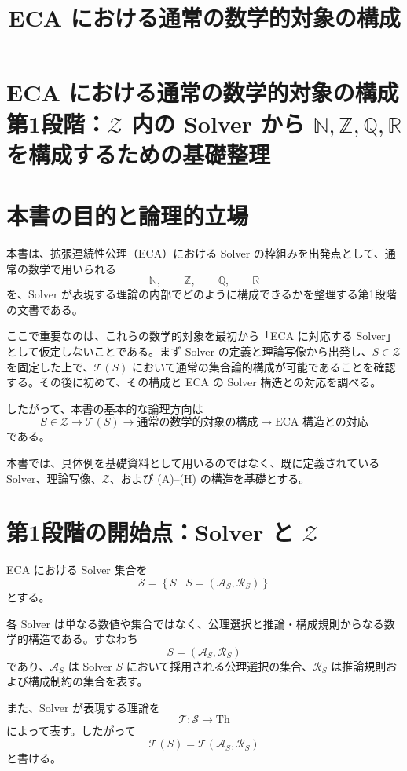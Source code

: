 \documentclass[a4paper,11pt]{article}
\title{ECA における通常の数学的対象の構成}
\author{}
\date{}
\newcommand{\Solver}{\mathcal{S}}
\newcommand{\Aset}{\mathcal{A}}
\newcommand{\Rset}{\mathcal{R}}
\newcommand{\Th}{\mathrm{Th}}
\newcommand{\Th}{\mathrm{Th}}
\begin{document}
\maketitle

\section{ECA における通常の数学的対象の構成 \large{第1段階：$\mathcal{Z}$ 内の Solver から $\mathbb{N},\mathbb{Z},\mathbb{Q},\mathbb{R}$ を構成するための基礎整理}}

\section{本書の目的と論理的立場}
本書は、拡張連続性公理（ECA）における Solver の枠組みを出発点として、通常の数学で用いられる
\[
\mathbb{N},\qquad \mathbb{Z},\qquad \mathbb{Q},\qquad \mathbb{R}
\]
を、Solver が表現する理論の内部でどのように構成できるかを整理する第1段階の文書である。

ここで重要なのは、これらの数学的対象を最初から「ECA に対応する Solver」として仮定しないことである。まず Solver の定義と理論写像から出発し、$S\in\mathcal{Z}$ を固定した上で、$\mathcal{T}(S)$ において通常の集合論的構成が可能であることを確認する。その後に初めて、その構成と ECA の Solver 構造との対応を調べる。

したがって、本書の基本的な論理方向は
\[
\boxed{S\in\mathcal{Z}\longrightarrow\mathcal{T}(S)\longrightarrow\text{通常の数学的対象の構成}\longrightarrow\text{ECA 構造との対応}}
\]
である。

本書では、具体例を基礎資料として用いるのではなく、既に定義されている Solver、理論写像、$\mathcal{Z}$、および (A)--(H) の構造を基礎とする。

\section{第1段階の開始点：Solver と $\mathcal{Z}$}
ECA における Solver 集合を
\[
\Solver=\left\{S\mid S=(\Aset_S,\Rset_S)\right\}
\]
とする。

各 Solver は単なる数値や集合ではなく、公理選択と推論・構成規則からなる数学的構造である。すなわち
\[
S=(\Aset_S,\Rset_S)
\]
であり、$\Aset_S$ は Solver $S$ において採用される公理選択の集合、$\Rset_S$ は推論規則および構成制約の集合を表す。

また、Solver が表現する理論を
\[
\mathcal{T}:\Solver\longrightarrow\Th
\]
によって表す。したがって
\[
\mathcal{T}(S)=\mathcal{T}(\Aset_S,\Rset_S)
\]
と書ける。
\end{document}
